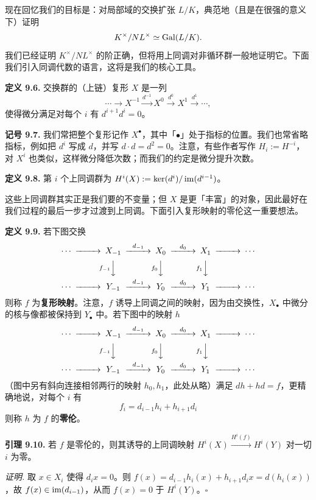 现在回忆我们的目标是：对局部域的交换扩张 $L/K$，典范地（且是在很强的意义下）证明
\[
K^\times/NL^\times\simeq\operatorname{Gal}(L/K).
\]
我们已经证明 $K^\times/NL^\times$ 的阶正确，但将用上同调对非循环群一般地证明它。下面我们引入同调代数的语言，这将是我们的核心工具。

\textbf{定义 9.6.} 交换群的（上链）复形 $X$ 是一列
\[
\cdots\to X^{-1}\xrightarrow{d^{-1}}X^0\xrightarrow{d^0}X^1\xrightarrow{d^1}\cdots,
\]
使得微分满足对每个 $i$ 有 $d^{i+1}d^i=0$。

\textbf{记号 9.7.} 我们常把整个复形记作 $X^\bullet$，其中「$\bullet$」处于指标的位置。我们也常省略指标，例如把 $d^i$ 写成 $d$，并写 $d\cdot d=d^2=0$。注意，有些作者写作 $H_i:=H^{-i}$，对 $X^i$ 也类似，这样微分降低次数；而我们的约定是微分提升次数。

\textbf{定义 9.8.} 第 $i$ 个上同调群为 $H^i(X):=\ker(d^i)/\operatorname{im}(d^{i-1})$。

这些上同调群其实正是我们要的不变量；但 $X$ 是更「丰富」的对象，因此最好在我们过程的最后一步才过渡到上同调。下面引入复形映射的零伦这一重要想法。

\textbf{定义 9.9.} 若下图交换
\[
\begin{CD}
\cdots @>>> X_{-1} @>d_{-1}>> X_0 @>d_0>> X_1 @>>> \cdots\\
@. @V{f_{-1}}VV @V{f_0}VV @V{f_1}VV @.\\
\cdots @>>> Y_{-1} @>d_{-1}>> Y_0 @>d_0>> Y_1 @>>> \cdots
\end{CD}
\]
则称 $f$ 为\textbf{复形映射}。注意，$f$ 诱导上同调之间的映射，因为由交换性，$X_\bullet$ 中微分的核与像都被保持到 $Y_\bullet$ 中。若下图中的映射 $h$
\[
\begin{CD}
\cdots @>>> X_{-1} @>d_{-1}>> X_0 @>d_0>> X_1 @>>> \cdots\\
@. @V{f_{-1}}VV @V{f_0}VV @V{f_1}VV @.\\
\cdots @>>> Y_{-1} @>d_{-1}>> Y_0 @>d_0>> Y_1 @>>> \cdots
\end{CD}
\]
（图中另有斜向连接相邻两行的映射 $h_0,h_1$，此处从略）满足 $dh+hd=f$，更精确地说，对每个 $i$ 有
\[
f_i=d_{i-1}h_i+h_{i+1}d_i
\]
则称 $h$ 为 $f$ 的\textbf{零伦}。

\textbf{引理 9.10.} 若 $f$ 是零伦的，则其诱导的上同调映射 $H^i(X)\xrightarrow{H^i(f)}H^i(Y)$ 对一切 $i$ 为零。

\textit{证明.} 取 $x\in X_i$ 使得 $d_ix=0$。则 $f(x)=d_{i-1}h_i(x)+h_{i+1}d_ix=d(h_i(x))$，故 $f(x)\in\operatorname{im}(d_{i-1})$，从而 $f(x)=0$ 于 $H^i(Y)$。\hfill$\square$

